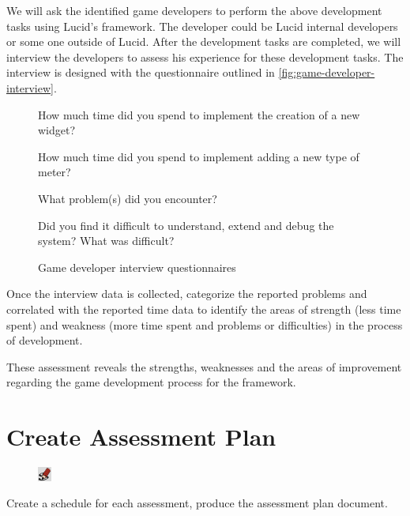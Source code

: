 \documentclass[11pt,oneside]{book}
\begin{document}
We will ask the identified game developers to perform the above development tasks using Lucid's framework. The developer could be Lucid internal developers or some one outside of Lucid.  After the development tasks are completed, we will interview the developers to assess his experience for these development tasks. The interview is designed with the questionnaire outlined in \autoref{fig:game-developer-interview}.

\begin{figure}[ht!]
\begin{mybox}
\begin{compactenum}
\item How much time did you spend to implement the creation of a new widget?
\item How much time did you spend to implement adding a new type of meter?
\item What problem(s) did you encounter?
\item Did you find it difficult to understand, extend and debug the system? What was difficult?
\end{compactenum}
\end{mybox}
\caption{Game developer interview questionnaires}
\label{fig:game-developer-interview}  
\end{figure}

Once the interview data is collected, categorize the reported problems and correlated with the reported time data to identify the areas of strength (less time spent) and weakness (more time spent and problems or difficulties) in the process of development. 

These assessment reveals the strengths, weaknesses and the areas of improvement regarding the game development process for the framework.

\section{Create Assessment Plan}
\begin{shadebox}
\begin{figure}
\vspace{-15pt}\hspace{-10pt}
    \includegraphics[width=0.04\textwidth]{note-icon}
\end{figure}
Create a schedule for each assessment, produce the assessment plan document.
\end{shadebox}
\end{document}
